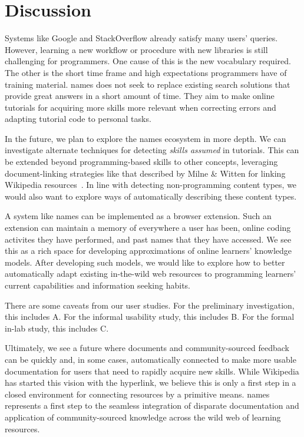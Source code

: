 \section{Discussion}

Systems like Google and StackOverflow already satisfy many users' queries.
However, learning a new workflow or procedure with new libraries is still challenging for programmers.
One cause of this is the new vocabulary required.
The other is the short time frame and high expectations programmers have of training material.
\Glspl{name} does not seek to replace existing search solutions that provide great answers in a short amount of time.
They aim to make online tutorials for acquiring more skills more relevant when correcting errors and adapting tutorial code to personal tasks.

In the future, we plan to explore the \Glspl{name} ecosystem in more depth.
We can investigate alternate techniques for detecting \emph{skills assumed} in tutorials.
This can be extended beyond programming-based skills to other concepts, leveraging document-linking strategies like that described by Milne \& Witten for linking Wikipedia resources~\cite{milne_learning_2008}.
In line with detecting non-programming content types, we would also want to explore ways of automatically describing these content types.

A system like \Glspl{name} can be implemented as a browser extension.
Such an extension can maintain a memory of everywhere a user has been, online coding activites they have performed, and past \glspl{name} that they have accessed.
We see this as a rich space for developing approximations of online learners' knowledge models.
After developing such models, we would like to explore how to better automatically adapt existing in-the-wild web resources to programming learners' current capabilities and information seeking habits.

There are some caveats from our user studies.
For the preliminary investigation, this includes A.
For the informal usability study, this includes B.
For the formal in-lab study, this includes C.

Ultimately, we see a future where documents and community-sourced feedback can be quickly and, in some cases, automatically connected to make more usable documentation for users that need to rapidly acquire new skills.
While Wikipedia has started this vision with the hyperlink, we believe this is only a first step in a closed environment for connecting resources by a primitive means.
\Glspl{name} represents a first step to the seamless integration of disparate documentation and application of community-sourced knowledge across the wild web of learning resources.
